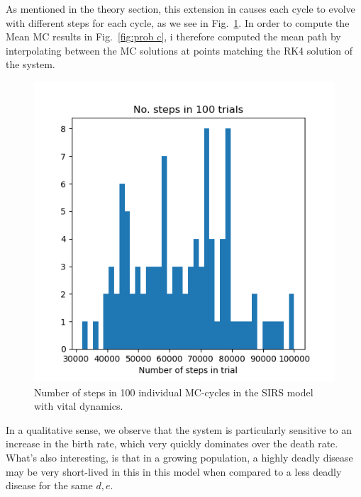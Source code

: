 \documentclass[10pt,showpacs,preprintnumbers,amsmath,amssymb,nofootinbib,aps,prl,twocolumn,groupedaddress,superscriptaddress,showkeys]{revtex4-1}
\begin{document}
    As mentioned in the theory section, this extension in causes each cycle to evolve with different steps for each cycle, as we see in Fig.~\ref{fig: vitdyn steps}. In order to compute the Mean MC results in Fig.~\ref{fig:prob c}, i therefore computed the mean path by interpolating between the MC solutions at points matching the RK4 solution of the system.

    \begin{figure}[h!]
      \includegraphics[width=\columnwidth]{figs/num_steps_c.png}
      \caption{\label{fig: vitdyn steps}Number of steps in 100 individual MC-cycles in the SIRS model with vital dynamics.}
    \end{figure}

    In a qualitative sense, we observe that the system is particularly sensitive to an increase in the birth rate, which very quickly dominates over the death rate. What's also interesting, is that in a growing population, a highly deadly disease may be very short-lived in this in this model when compared to a less deadly disease for the same $d, e$.
\end{document}
